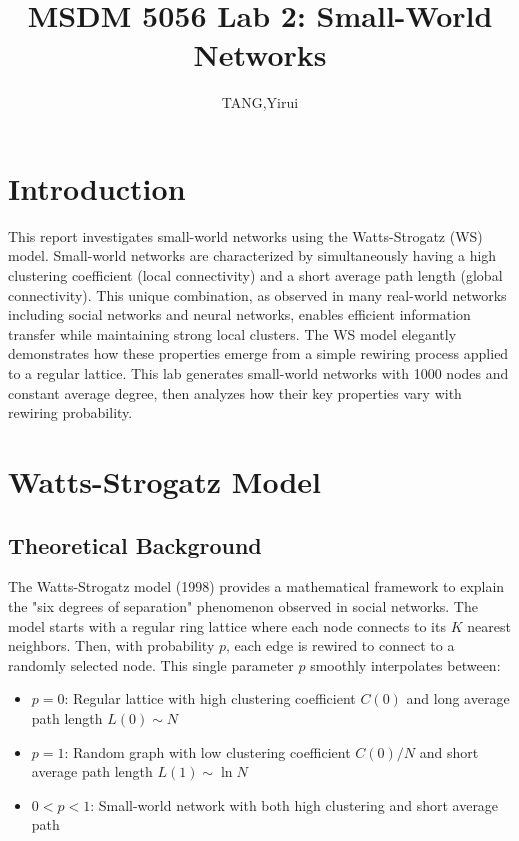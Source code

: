 \documentclass[11pt,a4paper]{article}
\title{MSDM 5056 Lab 2: Small-World Networks}
\author{TANG,Yirui}
\date{}
\begin{document}
\maketitle

\section{Introduction}
\indent

This report investigates small-world networks using the Watts-Strogatz (WS) model. Small-world networks are characterized by simultaneously having a high clustering coefficient (local connectivity) and a short average path length (global connectivity). This unique combination, as observed in many real-world networks including social networks and neural networks, enables efficient information transfer while maintaining strong local clusters. The WS model elegantly demonstrates how these properties emerge from a simple rewiring process applied to a regular lattice. This lab generates small-world networks with 1000 nodes and constant average degree, then analyzes how their key properties vary with rewiring probability.

\section{Watts-Strogatz Model}

\subsection{Theoretical Background}
\indent

The Watts-Strogatz model (1998) provides a mathematical framework to explain the "six degrees of separation" phenomenon observed in social networks. The model starts with a regular ring lattice where each node connects to its $K$ nearest neighbors. Then, with probability $p$, each edge is rewired to connect to a randomly selected node. This single parameter $p$ smoothly interpolates between:

\begin{itemize}
    \item $p=0$: Regular lattice with high clustering coefficient $C(0)$ and long average path length $L(0) \sim N$
    \item $p=1$: Random graph with low clustering coefficient $C(0)/N$ and short average path length $L(1) \sim \ln N$
    \item $0 < p < 1$: Small-world network with both high clustering and short average path
\end{itemize}
\end{document}
